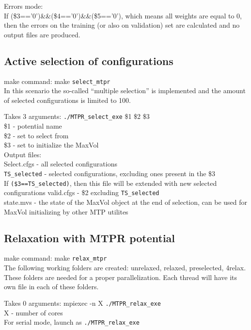 \documentclass[12pt]{article}
\renewcommand{\_}{\char`_}
\begin{document}
Errors mode:\\
If (\$3==’0’)\&\&(\$4==’0’)\&\&(\$5==’0’), which means all weights are equal to 0, then
the errors on the training (or also on validation) set are calculated and no output files are produced.

\subsection*{Active selection of configurations}

make command: make \verb|select_mtpr|\\
  
In this scenario the so-called “multiple selection” is implemented and the amount
of selected
configurations is limited to 100.


\noindent Takes 3 arguments: \verb|./MTPR_select_exe| \$1 \$2 \$3\\
\$1 - potential name\\
\$2 - set to select from\\
\$3 - set to initialize the MaxVol\\

Output files: \\
Select.cfgs -  all selected configurations\\
\verb|TS_selected| - selected configurations, excluding ones present in the \$3 \\
If \verb|($3==TS_selected)|, then this file will be extended with new selected configurations
valid.cfgs -  \$2 excluding \verb|TS_selected| \\
state.mvs - the state of the MaxVol object at the end of selection, can be used for MaxVol initializing by other MTP utilites

\subsection*{Relaxation with MTPR potential}

make command: make \verb|relax_mtpr|\\
   
The following working folders are created: unrelaxed, relaxed, preselected,
4relax. These folders are needed for a proper parallelization. Each thread 
will have its own file in each of these folders. 
     
Takes 0 arguments: mpiexec -n X \verb|./MTPR_relax_exe|\\
X - number of cores\\
For serial mode, launch as \verb|./MTPR_relax_exe |\\
\end{document}

